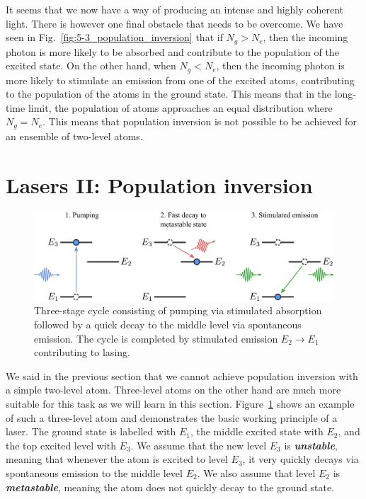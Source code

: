 It seems that we now have a way of producing an intense and highly coherent light.
There is however one final obstacle that needs to be overcome.
We have seen in Fig.~\ref{fig:5-3_population_inversion} that if $N_g > N_e$, then the incoming photon is more likely to be absorbed and contribute to the population of the excited state.
On the other hand, when $N_g < N_e$, then the incoming photon is more likely to stimulate an emission from one of the excited atoms, contributing to the population of the atoms in the ground state.
This means that in the long-time limit, the population of atoms approaches an equal distribution where $N_g = N_e$.
This means that population inversion is not possible to be achieved for an ensemble of two-level atoms.



\section{Lasers II: Population inversion}
\label{sec:5-4_lasers2}

\begin{figure}[t]
    \centering
    \includegraphics[width=\textwidth]{lesson5/5-4_three-level-atom.pdf}
    \caption[Laser cycle]{Three-stage cycle consisting of pumping via stimulated absorption followed by a quick decay to the middle level via spontaneous emission. The cycle is completed by stimulated emission $E_2 \rightarrow E_1$ contributing to lasing.}
    \label{fig:5-4_three_level_atom}
\end{figure}

We said in the previous section that we cannot achieve population inversion with a simple two-level atom.
Three-level atoms on the other hand are much more suitable for this task as we will learn in this section.
Figure~\ref{fig:5-4_three_level_atom} shows an example of such a three-level atom and demonstrates the basic working principle of a laser.
The ground state is labelled with $E_1$, the middle excited state with $E_2$, and the top excited level with $E_3$.
We assume that the new level $E_3$ is \textit{\textbf{unstable}}, meaning that whenever the atom is excited to level $E_3$, it very quickly decays via spontaneous emission to the middle level $E_2$.
We also assume that level $E_2$ is \textit{\textbf{metastable}}, meaning the atom does not quickly decay to the ground state.


